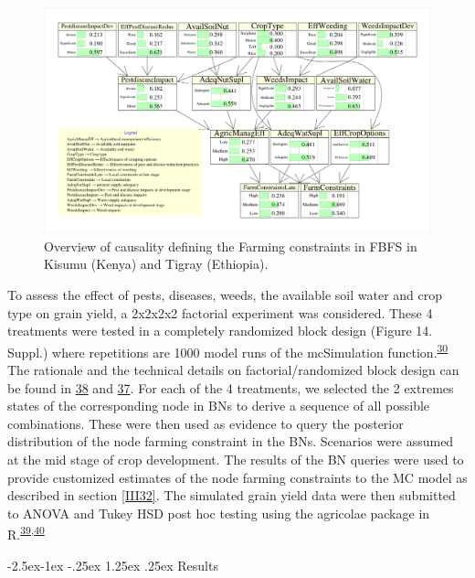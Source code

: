 \documentclass[12pt,oneside]{article}
\makeatletter
\renewcommand\paragraph{\@startsection{paragraph}{4}{\z@}%
            {-2.5ex\@plus -1ex \@minus -.25ex}%
            {1.25ex \@plus .25ex}%
            {\normalfont\normalsize\bfseries}}
\makeatother
\begin{document}
\begin{figure}[!htbp]

{\centering \includegraphics[width=1\linewidth,]{figures/Modelling_FBFS_Farming_Constraints} 

}

\caption{Overview of causality defining the Farming constraints in FBFS in Kisumu (Kenya) and Tigray (Ethiopia).}\label{fig:fig9}
\end{figure}

To assess the effect of pests, diseases, weeds, the available soil water and crop type on grain yield, a 2x2x2x2 factorial experiment was considered. These 4 treatments were tested in a completely randomized block design (Figure 14. Suppl.) where repetitions are 1000 model runs of the mcSimulation function.\textsuperscript{\protect\hyperlink{ref-Luedeling_and_Goehring_2018}{30}} The rationale and the technical details on factorial/randomized block design can be found in \protect\hyperlink{ref-Panse_and_Sukhatme_1957}{38} and \protect\hyperlink{ref-Gomez_and_Gomez_1984}{37}. For each of the 4 treatments, we selected the 2 extremes states of the corresponding node in BNs to derive a sequence of all possible combinations. These were then used as evidence to query the posterior distribution of the node farming constraint in the BNs. Scenarios were assumed at the mid stage of crop development. The results of the BN queries were used to provide customized estimates of the node farming constraints to the MC model as described in section \ref{III32}. The simulated grain yield data were then submitted to ANOVA and Tukey HSD post hoc testing using the agricolae package in R.\textsuperscript{\protect\hyperlink{ref-DeMendiburu_2016}{39},\protect\hyperlink{ref-RCoreTeam_2018}{40}}

\hypertarget{IV233}{%
\paragraph{Results}\label{IV233}}
\end{document}
